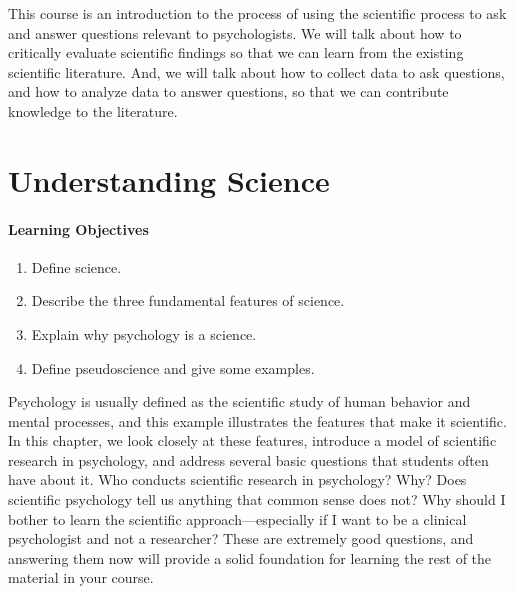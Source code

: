 This course is an introduction to the process of using the scientific process to ask and answer questions relevant to psychologists. We will talk about how to critically evaluate scientific findings so that we can learn from the existing scientific literature. And, we will talk about how to collect data to ask questions, and how to analyze data to answer questions, so that we can contribute knowledge to the literature.

\section{Understanding Science}

\paragraph{Learning Objectives}
\begin{enumerate}
\item Define science.
\item Describe the three fundamental features of science.
\item Explain why psychology is a science.
\item Define pseudoscience and give some examples.
\end{enumerate}


Psychology is usually defined as the scientific study of human behavior and mental processes, and this example illustrates the features that make it scientific. In this chapter, we look closely at these features, introduce a model of scientific research in psychology, and address several basic questions that students often have about it. Who conducts scientific research in psychology? Why? Does scientific psychology tell us anything that common sense does not? Why should I bother to learn the scientific approach---especially if I want to be a clinical psychologist and not a researcher? These are extremely good questions, and answering them now will provide a solid foundation for learning the rest of the material in your course.

